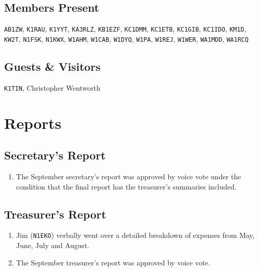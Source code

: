 \documentclass[10pt,letterpaper]{article}
\begin{document}
\subsection{Members Present}

\texttt{AB1ZW},
\texttt{K1RAU},
\texttt{K1YYT},
\texttt{KA3RLZ},
\texttt{KB1EZF},
\texttt{KC1DMM},
\texttt{KC1ETB},
\texttt{KC1GIB},
\texttt{KC1IDO},
\texttt{KM1D},
\texttt{KW2T},
\texttt{N1FSK},
\texttt{N1KWX},
\texttt{W1AHM},
\texttt{W1CAB},
\texttt{W1DYQ},
\texttt{W1PA},
\texttt{W1REJ},
\texttt{W1WER},
\texttt{WA1MDD},
\texttt{WA1RCQ}

\subsection{Guests \& Visitors}

\texttt{K1TIN},
Christopher Wentworth


\section{Reports}

\subsection{Secretary's Report}
\begin{enumerate}
  \item The September secretary's report was approved by voice vote under the condition that the final report has the treasurer's summaries included.
\end{enumerate}

\newpage
\subsection{Treasurer's Report}
\begin{enumerate}
  \item Jim (\texttt{N1EKO}) verbally went over a detailed breakdown of expenses from May, June, July and August.
  \item The September treasurer's report was approved by voice vote.
\end{enumerate}
\end{document}
